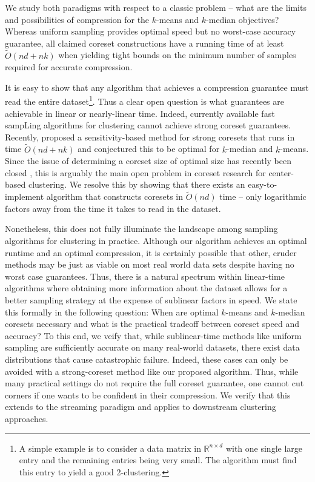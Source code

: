 We study both paradigms with respect to a classic problem -- what are the limits and possibilities of compression for the $k$-means and $k$-median objectives?
Whereas uniform sampling provides optimal speed but no worst-case accuracy guarantee, all claimed coreset constructions have a running time of at least
$\tilde{O}(nd+nk)$ when yielding tight bounds on the minimum number of samples required for accurate compression. 

It is easy to show that any algorithm that achieves a compression guarantee must read the entire dataset\footnote{A simple example is to consider a data matrix
in $\mathbb{R}^{n \times d}$ with one single large entry and the remaining entries being very small. The algorithm must find this entry to yield a good
2-clustering.}. Thus a clear open question is what guarantees are achievable in linear or nearly-linear time. Indeed, currently available fast sampLing
algorithms for clustering \cite{BachemL018} \cite{kmeans_sublinear_bachem16} cannot achieve strong coreset guarantees.  Recently, \cite{DSWY22} proposed
a sensitivity-based method for strong coresets that runs in time $\tilde{O}(nd + nk)$ and conjectured this to be optimal for $k$-median and $k$-means.  Since
the issue of determining a coreset size of optimal size has recently been closed \cite{CSS21,CLSSS22,huangLB}, this is arguably the main open problem in coreset
research for center-based clustering. We resolve this by showing that there exists an easy-to-implement algorithm that constructs coresets in $\tilde{O}(nd)$
time -- only logarithmic factors away from the time it takes to read in the dataset.

Nonetheless, this does not fully illuminate the landscape among sampling algorithms for clustering in practice. Although our algorithm achieves an optimal
runtime and an optimal compression, it is certainly possible that other, cruder methods may be just as viable on most real world data sets despite having no
worst case guarantees.  Thus, there is a natural spectrum within linear-time algorithms where obtaining more information about the dataset allows for a better
sampling strategy at the expense of sublinear factors in speed. We state this formally in the following question: When are optimal $k$-means and $k$-median
coresets necessary and what is the practical tradeoff between coreset speed and accuracy? To this end, we veify that, while sublinear-time methods like uniform
sampling are sufficiently accurate on many real-world datasets, there exist data distributions that cause catastrophic failure. Indeed, these cases can only be
avoided with a strong-coreset method like our proposed algorithm. Thus, while many practical settings do not require the full coreset guarantee, one cannot cut
corners if one wants to be confident in their compression. We verify that this extends to the streaming paradigm and applies to downstream clustering
approaches.

